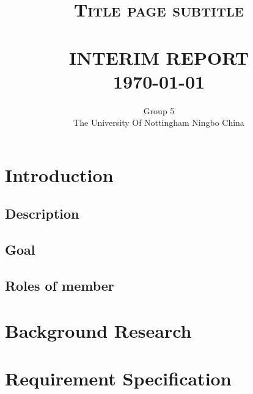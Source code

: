 \documentclass[paper=a4, fontsize=11pt,twoside]{scrartcl}		%
\title{	\normalsize \textsc{Title page subtitle} 	%
		 	\\[2.0cm]													%
			\HRule{0.5pt} \\										%
			\LARGE \textbf{\uppercase{Interim Report}}	%
			\HRule{2pt} \\ [0.5cm]								%
			\normalsize \today									%
		}
\author{
		Group 5\\	
		The University Of Nottingham Ningbo China\\	
        }
\makeatletter
\def\printtitle{%
    {\centering \@title\par}}
\def\printauthor{%
    {\centering \large \@author}}
\makeatother
\begin{document}
\thispagestyle{empty}				%

\printtitle									%
  	\vfill
\printauthor								%
\newpage
\tableofcontents

\newpage



\section{Introduction}
\subsection{Description}
\subsection{Goal}
\subsection{Roles of member }

\section{Background Research}


\section{Requirement Specification}
\end{document}
